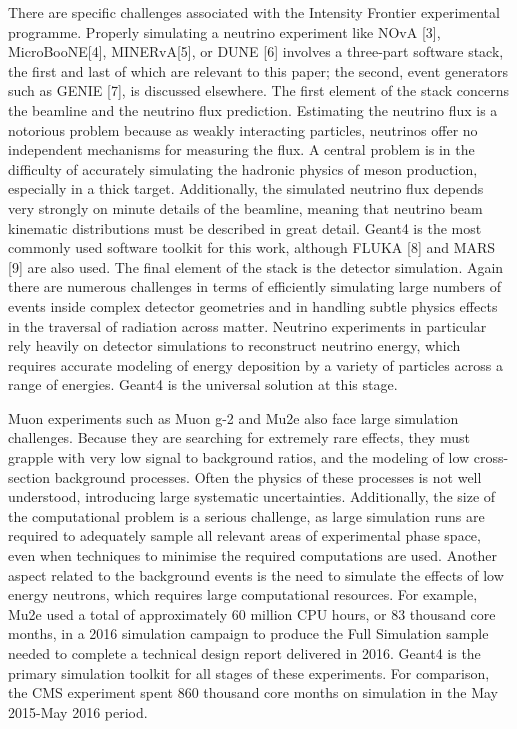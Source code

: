 \documentclass[12pt,a4paper]{article}
\begin{document}
There are specific challenges associated with the Intensity Frontier
experimental programme. Properly simulating a neutrino experiment like
NOvA {[}3{]}, MicroBooNE{[}4{]}, MINERvA{[}5{]}, or DUNE {[}6{]}
involves a three-part software stack, the first and last of which are
relevant to this paper; the second, event generators such as GENIE
{[}7{]}, is discussed elsewhere. The first element of the stack concerns
the beamline and the neutrino flux prediction. Estimating the neutrino
flux is a notorious problem because as weakly interacting particles,
neutrinos offer no independent mechanisms for measuring the flux. A
central problem is in the difficulty of accurately simulating the
hadronic physics of meson production, especially in a thick target.
Additionally, the simulated neutrino flux depends very strongly on
minute details of the beamline, meaning that neutrino beam kinematic
distributions must be described in great detail. Geant4 is the most
commonly used software toolkit for this work, although FLUKA {[}8{]} and
MARS {[}9{]} are also used. The final element of the stack is the
detector simulation. Again there are numerous challenges in terms of
efficiently simulating large numbers of events inside complex detector
geometries and in handling subtle physics effects in the traversal of
radiation across matter. Neutrino experiments in particular rely heavily
on detector simulations to reconstruct neutrino energy, which requires
accurate modeling of energy deposition by a variety of particles across
a range of energies. Geant4 is the universal solution at this stage.

Muon experiments such as Muon g-2 and Mu2e also face large simulation
challenges. Because they are searching for extremely rare effects, they
must grapple with very low signal to background ratios, and the modeling
of low cross-section background processes. Often the physics of these
processes is not well understood, introducing large systematic
uncertainties. Additionally, the size of the computational problem is a
serious challenge, as large simulation runs are required to adequately
sample all relevant areas of experimental phase space, even when
techniques to minimise the required computations are used. Another
aspect related to the background events is the need to simulate the
effects of low energy neutrons, which requires large computational
resources. For example, Mu2e used a total of approximately 60 million
CPU hours, or 83 thousand core months, in a 2016 simulation campaign to
produce the Full Simulation sample needed to complete a technical design
report delivered in 2016. Geant4 is the primary simulation toolkit for
all stages of these experiments. For comparison, the CMS experiment
spent 860 thousand core months on simulation in the May 2015-May 2016
period.
\end{document}
